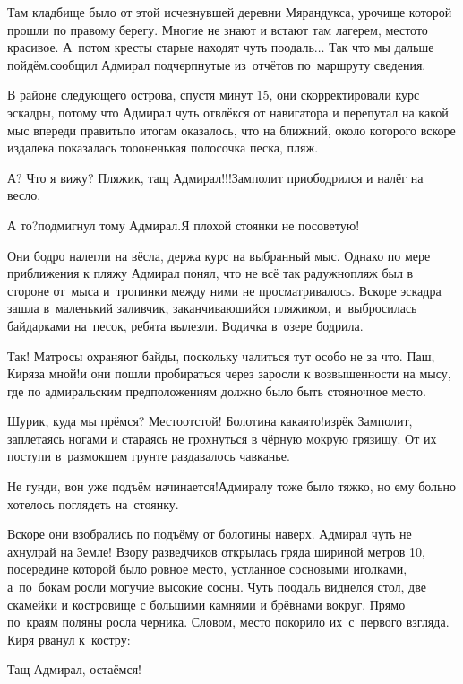 \diagdash Там кладбище было от этой исчезнувшей деревни Мярандукса, урочище которой прошли по правому берегу. Многие не знают и встают там лагерем, место\sdash то красивое. А~потом кресты старые находят чуть поодаль$\ldots$ Так что мы дальше пойдём.\mdash сообщил Адмирал подчерпнутые из~отчётов по~маршруту сведения.

В районе следующего острова, спустя минут 15, они скорректировали курс эскадры, потому что Адмирал чуть отвлёкся от навигатора и перепутал на какой мыс впереди править\mdash по итогам оказалось, что на ближний, около которого вскоре издалека показалась то\sdash о\sdash оненькая полосочка песка, пляж.

\diagdash А? Что я вижу? Пляжик, тащ Адмирал!!!\mdash Замполит приободрился и налёг на весло.

\diagdash А то?\mdash подмигнул тому Адмирал.\mdash Я плохой стоянки не посоветую!

Они бодро налегли на вёсла, держа курс на выбранный мыс. Однако по мере приближения к пляжу Адмирал понял, что не всё так радужно\mdash пляж был в стороне от~мыса и~тропинки между ними не просматривалось. Вскоре эскадра зашла в~маленький заливчик, заканчивающийся пляжиком, и~выбросилась байдарками на~песок, ребята вылезли. Водичка в~озере бодрила.

\diagdash Так! Матросы охраняют байды, поскольку чалиться тут особо не за что. Паш, Киря\mdash за мной!\mdash и они пошли пробираться через заросли к возвышенности на мысу, где по адмиральским предположениям должно было быть стояночное место.

\diagdash Шурик, куда мы прёмся? Место\mdash отстой! Болотина какая\sdash то!\mdash изрёк Замполит, заплетаясь ногами и стараясь не грохнуться в чёрную мокрую грязищу. От их поступи в~размокшем грунте раздавалось чавканье.

\diagdash Не гунди, вон уже подъём начинается!\mdash Адмиралу тоже было тяжко, но ему больно хотелось поглядеть на~стоянку. 

Вскоре они взобрались по подъёму от болотины наверх. Адмирал чуть не ахнул\mdash рай на Земле! Взору разведчиков открылась гряда шириной метров 10, посередине которой было ровное место, устланное сосновыми иголками, а~по~бокам росли могучие высокие сосны. Чуть поодаль виднелся стол, две скамейки и костровище с большими камнями и брёвнами вокруг. Прямо по~краям поляны росла черника. Словом, место покорило их~с~первого взгляда. Киря рванул к~костру:

\diagdash Тащ Адмирал, остаёмся!

